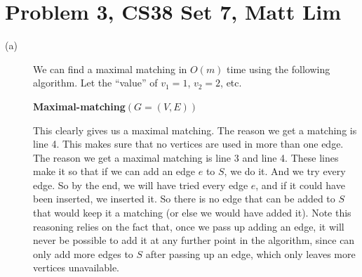 \documentclass{article}
\begin{document}
\section*{Problem 3, CS38 Set 7, Matt Lim}
\begin{description}
    \item[(a)]
        We can find a maximal matching in $O(m)$ time using the following
        algorithm. Let the ``value'' of $v_1 = 1$, $v_2 = 2$, etc.

        \vspace{5mm}
        \noindent \textbf{Maximal-matching}$(G = (V,E))$

        This clearly gives us a maximal matching. The reason we get a
        matching is line 4. This makes sure that no vertices are used
        in more than one edge. The reason we get a maximal matching is
        line 3 and line 4. These lines make it so that if we can add an edge $e$
        to $S$, we do it. And we try every edge. So by the end, we will have
        tried every edge $e$, and if it could have been inserted, we inserted it. So
        there is no edge that can be added to $S$ that would keep it a matching
        (or else we would have added it). Note this reasoning relies on the fact
        that, once we pass up adding an edge, it will never be possible to add
        it at any further point in the algorithm, since can only add more edges
        to $S$ after passing up an edge, which only leaves more vertices
        unavailable.


\end{description}
\end{document}
